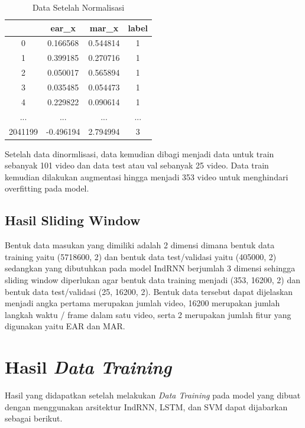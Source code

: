 \begin{longtable}{|c|c|c|c|}
  \caption{Data Setelah Normalisasi}
  \label{tb:NaNdata}                                             \\
  \hline
  \rowcolor[HTML]{C0C0C0}
  \textbf{} & \textbf{ear\_x} & \textbf{mar\_x} & \textbf{label} \\
  \hline
  0         & 0.166568        & 0.544814        & 1              \\
  1         & 0.399185        & 0.270716        & 1              \\
  2         & 0.050017        & 0.565894        & 1              \\
  3         & 0.035485        & 0.054473        & 1              \\
  4         & 0.229822        & 0.090614        & 1              \\
  ...       & ...             & ...             & ...            \\
  2041199   & -0.496194       & 2.794994        & 3              \\
  \hline
\end{longtable}

Setelah data dinormlisasi, data kemudian dibagi menjadi data untuk train sebanyak 101 video
dan data test atau val sebanyak 25 video. Data train kemudian dilakukan augmentasi hingga
menjadi 353 video untuk menghindari overfitting pada model.

\subsection{Hasil Sliding Window}

Bentuk data masukan yang dimiliki adalah 2 dimensi dimana bentuk data training yaitu (5718600, 2) dan
bentuk data test/validasi yaitu (405000, 2) sedangkan yang dibutuhkan pada model IndRNN berjumlah 3 dimensi sehingga sliding window
diperlukan agar bentuk data training menjadi (353, 16200, 2) dan bentuk data test/validasi (25, 16200, 2). Bentuk data tersebut dapat
dijelaskan menjadi angka pertama merupakan jumlah video, 16200 merupakan jumlah langkah waktu / frame dalam satu video, serta 2
merupakan jumlah fitur yang digunakan yaitu EAR dan MAR.

\section{Hasil \emph{Data Training}}

Hasil yang didapatkan setelah melakukan \emph{Data Training} pada model yang dibuat dengan menggunakan
arsitektur IndRNN, LSTM, dan SVM dapat dijabarkan sebagai berikut.

